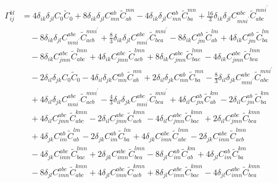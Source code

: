 \begin{align}
\Gamma^{kl}_{ij} &= 4 \delta_{ik} \delta_{jl} C_{0} \widetilde{C}_{0} + 8 \delta_{ik} \delta_{jl} C^{ab}_{mn} \widetilde{C}^{mn}_{ab} - 4 \delta_{ik} \delta_{jl} C^{ab}_{mn} \widetilde{C}^{mn}_{ba} + \frac{16}{3} \delta_{ik} \delta_{jl} C^{abc}_{mni^{\prime}} \widetilde{C}^{mni^{\prime}}_{abc} \\
&\quad -8 \delta_{ik} \delta_{jl} C^{abc}_{mni^{\prime}} \widetilde{C}^{mni^{\prime}}_{acb} + \frac{8}{3} \delta_{ik} \delta_{jl} C^{abc}_{mni^{\prime}} \widetilde{C}^{mni^{\prime}}_{bca} - 8 \delta_{ik} C^{ab}_{jm} \widetilde{C}^{lm}_{ab} + 4 \delta_{ik} C^{ab}_{jm} \widetilde{C}^{lm}_{ba} \\
&\quad -8 \delta_{ik} C^{abc}_{jmn} \widetilde{C}^{lmn}_{abc} + 4 \delta_{ik} C^{abc}_{jmn} \widetilde{C}^{lmn}_{acb} + 8 \delta_{ik} C^{abc}_{jmn} \widetilde{C}^{lmn}_{bac} - 4 \delta_{ik} C^{abc}_{jmn} \widetilde{C}^{lmn}_{bca} \\
&\quad -2 \delta_{il} \delta_{jk} C_{0} \widetilde{C}_{0} - 4 \delta_{il} \delta_{jk} C^{ab}_{mn} \widetilde{C}^{mn}_{ab} + 2 \delta_{il} \delta_{jk} C^{ab}_{mn} \widetilde{C}^{mn}_{ba} - \frac{8}{3} \delta_{il} \delta_{jk} C^{abc}_{mni^{\prime}} \widetilde{C}^{mni^{\prime}}_{abc} \\
&\quad {}+ 4 \delta_{il} \delta_{jk} C^{abc}_{mni^{\prime}} \widetilde{C}^{mni^{\prime}}_{acb} - \frac{4}{3} \delta_{il} \delta_{jk} C^{abc}_{mni^{\prime}} \widetilde{C}^{mni^{\prime}}_{bca} + 4 \delta_{il} C^{ab}_{jm} \widetilde{C}^{km}_{ab} - 2 \delta_{il} C^{ab}_{jm} \widetilde{C}^{km}_{ba} \\
&\quad {}+ 4 \delta_{il} C^{abc}_{jmn} \widetilde{C}^{kmn}_{abc} - 2 \delta_{il} C^{abc}_{jmn} \widetilde{C}^{kmn}_{acb} - 4 \delta_{il} C^{abc}_{jmn} \widetilde{C}^{kmn}_{bac} + 2 \delta_{il} C^{abc}_{jmn} \widetilde{C}^{kmn}_{bca} \\
&\quad {}+ 4 \delta_{jk} C^{ab}_{im} \widetilde{C}^{lm}_{ab} - 2 \delta_{jk} C^{ab}_{im} \widetilde{C}^{lm}_{ba} + 4 \delta_{jk} C^{abc}_{imn} \widetilde{C}^{lmn}_{abc} - 2 \delta_{jk} C^{abc}_{imn} \widetilde{C}^{lmn}_{acb} \\
&\quad -4 \delta_{jk} C^{abc}_{imn} \widetilde{C}^{lmn}_{bac} + 2 \delta_{jk} C^{abc}_{imn} \widetilde{C}^{lmn}_{bca} - 8 \delta_{jl} C^{ab}_{im} \widetilde{C}^{km}_{ab} + 4 \delta_{jl} C^{ab}_{im} \widetilde{C}^{km}_{ba} \\
&\quad -8 \delta_{jl} C^{abc}_{imn} \widetilde{C}^{kmn}_{abc} + 4 \delta_{jl} C^{abc}_{imn} \widetilde{C}^{kmn}_{acb} + 8 \delta_{jl} C^{abc}_{imn} \widetilde{C}^{kmn}_{bac} - 4 \delta_{jl} C^{abc}_{imn} \widetilde{C}^{kmn}_{bca} \\

\end{align}
